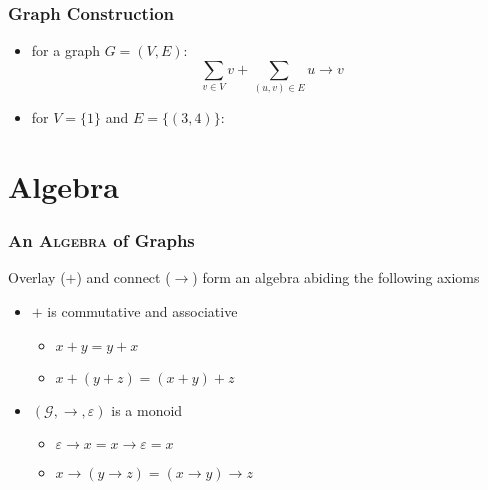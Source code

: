 \documentclass{beamer}
\renewcommand{\epsilon}{\varepsilon}
\newcommand{\eps}{\epsilon}
\newcommand{\connect}{\rightarrow}
\begin{document}
\begin{frame}
  \frametitle{Graph Construction}
  \begin{itemize}[<+->]
  \item for a graph $G = (V,E)$:
    \[
      \sum_{v \in V} v + \sum_{(u,v) \in E} u \connect v
    \]
  \item for $V = \{1\}$ and $E = \{(3,4)\}$:
    \vspace{2mm}
    \begin{center}
    \end{center}
  \end{itemize}
\end{frame}

\section{Algebra}
\begin{frame}
  \frametitle{An \textsc{Algebra} of Graphs}
  \onslide<+->
  \begin{alertblock}{Overlay ($+$) and connect ($\connect$) form an algebra
      abiding the following axioms}
    \begin{itemize}
    \item<+-> $+$ is commutative and associative
      \begin{itemize}
      \item $x + y = y + x$
      \item $x + (y + z) = (x + y) + z$
      \end{itemize}
    \item<+-> $(\mathcal{G}, \connect, \eps)$ is a monoid
      \begin{itemize}
      \item $\eps \connect x = x \connect \eps = x$
      \item $x \connect (y \connect z) = (x \connect y) \connect z$
      \end{itemize}
    \end{itemize}
  \end{alertblock}
\end{frame}
\end{document}
